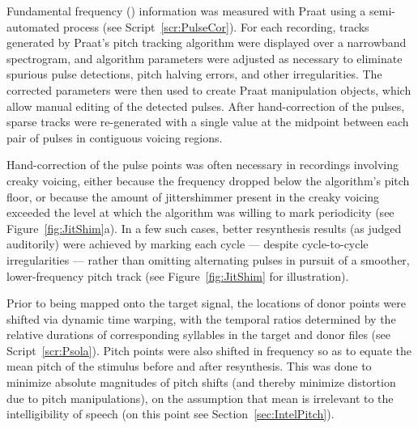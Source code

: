 Fundamental frequency (\fo) information was measured with Praat using a semi-automated process (see Script~\ref{scr:PulseCor}).  For each recording, \fo{} tracks generated by Praat’s pitch tracking algorithm were displayed over a narrowband spectrogram, and algorithm parameters were adjusted as necessary to eliminate spurious pulse detections, pitch halving errors, and other irregularities.  The corrected parameters were then used to create Praat manipulation objects, which allow manual editing of the detected pulses.  After hand-correction of the pulses, sparse \fo{} tracks were re-generated with a single value at the midpoint between each pair of pulses in contiguous voicing regions.

Hand-correction of the pulse points was often necessary in recordings involving creaky voicing, either because the frequency dropped below the algorithm’s pitch floor, or because the amount of jitter\slsh{}shimmer present in the creaky voicing exceeded the level at which the algorithm was willing to mark periodicity (see Figure~\ref{fig:JitShim}a).  In a few such cases, better resynthesis results (as judged auditorily) were achieved by marking each cycle — despite cycle-to-cycle irregularities — rather than omitting alternating pulses in pursuit of a smoother, lower-frequency pitch track (see Figure~\ref{fig:JitShim} for illustration).  %

Prior to being mapped onto the target signal, the locations of donor \fo{} points were shifted via dynamic time warping, with the temporal ratios determined by the relative durations of corresponding syllables in the target and donor files (see Script~\ref{scr:Psola}).  Pitch points were also shifted in frequency so as to equate the mean pitch of the stimulus before and after resynthesis.  This was done to minimize absolute magnitudes of pitch shifts (and thereby minimize distortion due to pitch manipulations), on the assumption that mean \fo{} is irrelevant to the intelligibility of speech (on this point see Section~\ref{sec:IntelPitch}).

